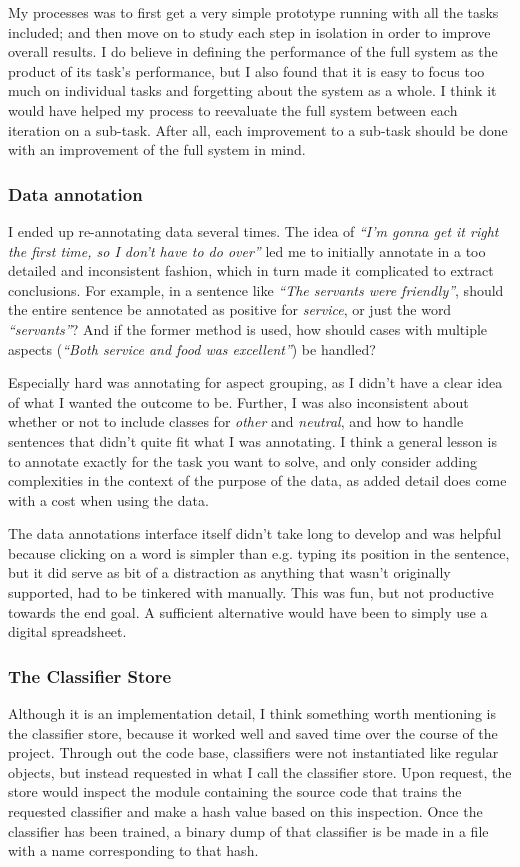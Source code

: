 \documentclass[a4paper,11pt]{kth-mag}
\begin{document}
My processes was to first get a very simple prototype running with all the tasks included; and then move on to study each step in isolation in order to improve overall results. I do believe in defining the performance of the full system as the product of its task's performance, but I also found that it is easy to focus too much on individual tasks and forgetting about the system as a whole. I think it would have helped my process to reevaluate the full system between each iteration on a sub-task. After all, each improvement to a sub-task should be done with an improvement of the full system in mind.

\subsubsection{Data annotation}
I ended up re-annotating data several times. The idea of \emph{``I'm gonna get it right the first time, so I don't have to do over''} led me to initially annotate in a too detailed and inconsistent fashion, which in turn made it complicated to extract conclusions. For example, in a sentence like \emph{``The servants were friendly''}, should the entire sentence be annotated as positive for \emph{service}, or just the word \emph{``servants''}? And if the former method is used, how should cases with multiple aspects (\emph{``Both service and food was excellent''}) be handled?

Especially hard was annotating for aspect grouping, as I didn't have a clear idea of what I wanted the outcome to be. Further, I was also inconsistent about whether or not to include classes for \emph{other} and \emph{neutral}, and how to handle sentences that didn't quite fit what I was annotating. I think a general lesson is to annotate exactly for the task you want to solve, and only consider adding complexities in the context of the purpose of the data, as added detail does come with a cost when using the data.

The data annotations interface itself didn't take long to develop and was helpful because clicking on a word is simpler than e.g. typing its position in the sentence, but it did serve as bit of a distraction as anything that wasn't originally supported, had to be tinkered with manually. This was fun, but not productive towards the end goal. A sufficient alternative would have been to simply use a digital spreadsheet.


\subsubsection{The Classifier Store}
Although it is an implementation detail, I think something worth mentioning is the classifier store,
because it worked well and saved time over the course of the project. Through out the code base,
classifiers were not instantiated like regular objects, but instead requested in what I call the
classifier store.
Upon request, the store would inspect the module containing the source code that trains
the requested classifier and make a hash value based on this inspection.
Once the classifier has been trained, a binary dump of that classifier is be made in a file with a name
corresponding to that hash.
\end{document}
